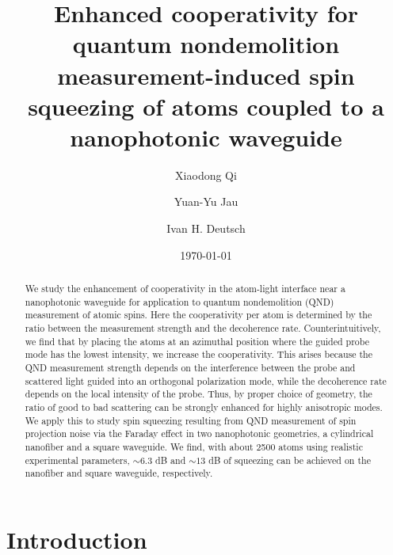\documentclass[preprint,aps,pra,onecolumn,superscriptaddress]{revtex4-1} %
\begin{document}
\title{Enhanced cooperativity for quantum nondemolition measurement-induced spin squeezing of atoms coupled to a nanophotonic waveguide}
\author{Xiaodong Qi}
\author{Yuan-Yu Jau}
\author{Ivan H. Deutsch}
\date{\today}

\begin{abstract}
We study the enhancement of cooperativity in the atom-light interface near a nanophotonic waveguide for application to quantum nondemolition (QND) measurement of atomic spins.  Here the cooperativity per atom is determined by the ratio between the  measurement strength and the decoherence rate.  Counterintuitively, we find that by placing the atoms at an azimuthal position where the guided probe mode has the lowest intensity, we increase the cooperativity.  This arises because the QND measurement strength depends on the interference between the probe and scattered light guided into an orthogonal polarization mode, while the decoherence rate depends on the local intensity of the probe.  Thus, by proper choice of geometry, the ratio of good to bad scattering can be strongly enhanced for highly anisotropic modes. We apply this to study spin squeezing resulting from QND measurement of spin projection noise via the Faraday effect in two nanophotonic geometries, a cylindrical nanofiber and a square waveguide.  We find, with about 2500 atoms using realistic experimental parameters, $ \sim 6.3 $ dB and $ \sim 13 $ dB of squeezing can be achieved on the nanofiber and square waveguide, respectively. 
\end{abstract}

\maketitle

\section{Introduction}
\end{document}
